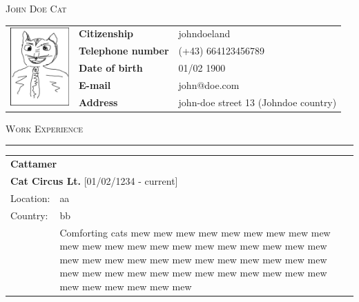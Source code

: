 \documentclass[
	fontsize = 10.0pt,
	a4paper,
	parskip = half*,
	twoside,	%
]{scrartcl}
\makeatletter
\renewcommand{\arraystretch}{1.5}			%
\newcommand\CVname{John Doe Cat}
\newcommand\CVcitizenship{johndoeland}
\newcommand\CVphonenumber{(+43) 664123456789}
\newcommand\CVbirthdate{01/02 1900}
\newcommand\CVmail{john@doe.com}
\newcommand\CVaddress{john-doe street 13 (Johndoe country)}
\newcommand{\hlinewidth}{0.5mm}
\newcommand{\hlinelength}{150mm}
\newcommand{\hlinecolor}{black!25}
\newcommand{\hlinevskip}{-4.0mm}
\makeatother
\begin{document}



	{\fontsize{20pt}{17pt}\selectfont\scshape \CVname}

	\renewcommand{\arraystretch}{1.40}
	\begin{table}[H]
		\begin{tabular}{ p{3cm} l l }		%
			\multirow{5}{*}{\includegraphics[height = 3.0cm]{cv_photo}}		&	\textbf{Citizenship}		&	\CVcitizenship	\\
																			&	\textbf{Telephone number}	&	\CVphonenumber	\\
																			&	\textbf{Date of birth}		&	\CVbirthdate	\\
																			&	\textbf{E-mail}				&	\CVmail			\\
																			&	\textbf{Address}			&	\CVaddress		\\
		\end{tabular}
	\end{table}%

	{\fontsize{20pt}{17pt}\selectfont\scshape Work Experience}
	\vskip \hlinevskip%
	\textcolor{\hlinecolor}{\rule{\hlinelength}{\hlinewidth}}

	\renewcommand{\arraystretch}{1.25}			%
	\begin{table}[H]
		\begin{tabularx}{\textwidth}{l X}
			\multicolumn{2}{l}{{\fontsize{14pt}{10pt}\selectfont\bfseries Cattamer}}	\\
			\multicolumn{2}{l}{\textbf{Cat Circus Lt.} [01/02/1234 - current]}			\\
			Location:	& aa	\\
			Country:	& bb	\\
			\hspace{1.5mm} & Comforting cats mew mew mew mew mew mew mew mew mew mew mew mew mew mew mew mew mew mew mew mew mew mew mew mew mew mew mew mew mew mew mew mew mew mew mew mew mew mew mew mew mew mew mew mew mew mew mew mew mew mew mew\\
		\end{tabularx}
	\end{table}
\end{document}
